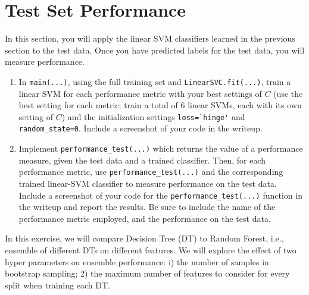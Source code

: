 \documentclass[11pt]{article}
\begin{document}
\section{Test Set Performance }\label{sec:test}
In this section, you will apply the linear SVM classifiers learned in the previous section to the test data. Once you have predicted labels for the test data, you will measure performance.

\begin{enumerate}
\item {}
In \verb|main(...)|, using the full training set and \verb|LinearSVC.fit(...)|, train a linear SVM for each performance metric with your best settings of $C$ (use the best setting for each metric; train a total of 6 linear SVMs, each with its own setting of $C$) and the initialization settings \verb|loss=`hinge'| and \verb|random_state=0|. Include a screenshot of your code in the writeup.
\vspace{3cm}

\item {} Implement \verb|performance_test(...)| which returns the value of a performance measure, given the test data and a trained classifier. Then, for each performance metric, use \verb|performance_test(...)| and the corresponding trained linear-SVM classifier to measure performance on the test data. Include a screenshot of your code for the \verb|performance_test(...)| function in the writeup and report the results. Be sure to include the name of the performance metric employed, and the performance on the test data.
\vspace{9cm}

\end{enumerate}

\newpage
{}
In this exercise, we will compare Decision Tree (DT) to Random Forest, i.e., ensemble of different DTs on different features. We will explore the effect of two hyper parameters on ensemble performance: i) the number of samples in bootstrap sampling; 2) the maximum number of features to consider for every split when training each DT.
\end{document}
